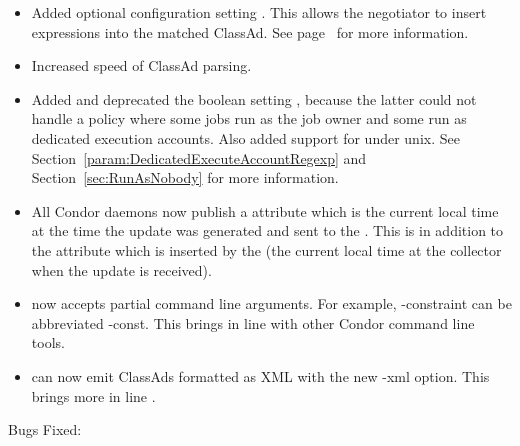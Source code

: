 \begin{itemize}
\item Added optional configuration setting
.  This allows the negotiator to
insert expressions into the matched ClassAd.  See
page~\pageref{param:NegotiatorMatchExprs} for more information.

\item Increased speed of ClassAd parsing.

\item Added  and
deprecated the boolean setting
, because the latter could not
handle a policy where some jobs run as the job owner and some run as
dedicated execution accounts.  Also added support for
 under unix.  See
Section~\ref{param:DedicatedExecuteAccountRegexp} and
Section~\ref{sec:RunAsNobody} for more information.

\item All Condor daemons now publish a  attribute
  which is the current local time at the time the update was generated
  and sent to the .
  This is in addition to the  attribute which is
  inserted by the  (the current local time at the
  collector when the update is received).

\item {} now accepts partial command line
arguments.  For example, -constraint can be abbreviated -const.
This brings  in line with other Condor command
line tools.

\item {} can now emit ClassAds formatted as XML with
the new -xml option.
This brings  more in line .

\end{itemize}

\noindent Bugs Fixed:


